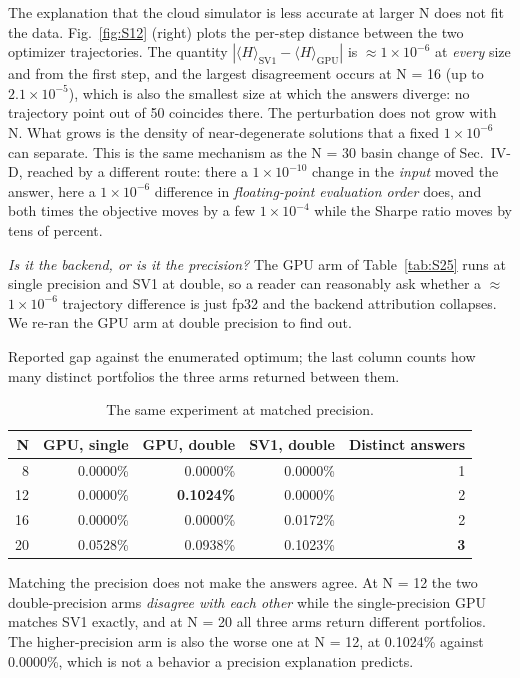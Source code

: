 \documentclass[journal]{IEEEtran}
\begin{document}
The explanation that the cloud simulator is less accurate at larger N does not fit the data. Fig.~\ref{fig:S12} (right) plots the per-step distance between the two optimizer trajectories. The quantity $|\langle H\rangle_{\mathrm{SV1}} - \langle H\rangle_{\mathrm{GPU}}|$ is $\approx$$1\times 10^{-6}$ at \textit{every} size and from the first step, and the largest disagreement occurs at N = 16 (up to $2.1\times 10^{-5}$), which is also the smallest size at which the answers diverge: no trajectory point out of 50 coincides there. The perturbation does not grow with N. What grows is the density of near-degenerate solutions that a fixed $1\times 10^{-6}$ can separate. This is the same mechanism as the N = 30 basin change of Sec.~IV-D, reached by a different route: there a $1\times 10^{-10}$ change in the \textit{input} moved the answer, here a $1\times 10^{-6}$ difference in \textit{floating-point evaluation order} does, and both times the objective moves by a few $1\times 10^{-4}$ while the Sharpe ratio moves by tens of percent.


\textit{Is it the backend, or is it the precision?} The GPU arm of Table~\ref{tab:S25} runs at single precision and SV1 at double, so a reader can reasonably ask whether a $\approx$$1\times 10^{-6}$ trajectory difference is just fp32 and the backend attribution collapses. We re-ran the GPU arm at double precision to find out.


Reported gap against the enumerated optimum; the last column counts how many distinct portfolios the three arms returned between them.


\begin{table}[!t]
\centering
\scriptsize
\caption{The same experiment at matched precision.}
\label{tab:S26}
\begin{tabular}{rrrrr}
\toprule
N & GPU, single & GPU, double & SV1, double & Distinct answers \\
\midrule
8 & 0.0000\% & 0.0000\% & 0.0000\% & 1 \\
12 & 0.0000\% & \textbf{0.1024\%} & 0.0000\% & 2 \\
16 & 0.0000\% & 0.0000\% & 0.0172\% & 2 \\
20 & 0.0528\% & 0.0938\% & 0.1023\% & \textbf{3} \\
\bottomrule
\end{tabular}
\end{table}


Matching the precision does not make the answers agree. At N = 12 the two double-precision arms \textit{disagree with each other} while the single-precision GPU matches SV1 exactly, and at N = 20 all three arms return different portfolios. The higher-precision arm is also the worse one at N = 12, at 0.1024\% against 0.0000\%, which is not a behavior a precision explanation predicts.
\end{document}
